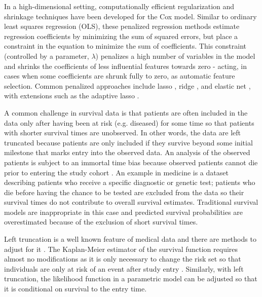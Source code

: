 \documentclass[11pt,final,fleqn]{article}\usepackage[]{graphicx}\usepackage[]{color}
\theoremstyle{plain}
\begin{document}
In a high-dimensional setting, computationally efficient regularization and shrinkage techniques have been developed \citep{tibshirani1997lasso, friedman2010regularization, simon2011regularization} for the Cox model. Similar to ordinary least squares regression (OLS), these penalized regression methods estimate regression coefficients by minimizing the sum of squared errors, but place a constraint in the equation to minimize the sum of coefficients. This constraint (controlled by a parameter, $\lambda$) penalizes a high number of variables in the model and shrinks the coefficients of less influential features towards zero - acting, in cases when some coefficients are shrunk fully to zero, as automatic feature selection. Common penalized approaches include lasso \citep{tibshirani1996regression}, ridge \citep{hoerl1970ridgeA, hoerl1970ridgeB}, and elastic net \citep{zou2005regularization}, with extensions such as the adaptive lasso \citep{zou2006adaptive}. 

A common challenge in survival data is that patients are often included in the data only after having been at risk (e.g. diseased) for some time so that patients with shorter survival times are unobserved. In other words, the data are left truncated because patients are only included if they survive beyond some initial milestone that marks entry into the observed data. An analysis of the observed patients is subject to an immortal time bias because observed patients cannot die prior to entering the study cohort \citep{levesque2010problem, giobbie2013challenges}. An example in medicine is a dataset describing patients who receive a specific diagnostic or genetic test; patients who die before having the chance to be tested are excluded from the data so their survival times do not contribute to overall survival estimates. Traditional survival models are inappropriate in this case and predicted survival probabilities are overestimated because of the exclusion of short survival times.

Left truncation is a well known feature of medical data and there are methods to adjust for it \citep{kalbfleisch2011statistical}. The Kaplan-Meier estimator of the survival function requires almost no modifications as it is only necessary to change the risk set so that individuals are only at risk of an event after study entry \citep{tsai1987note}. Similarly, with left truncation, the likelihood function in a parametric model can be adjusted so that it is conditional on survival to the entry time.
\end{document}
